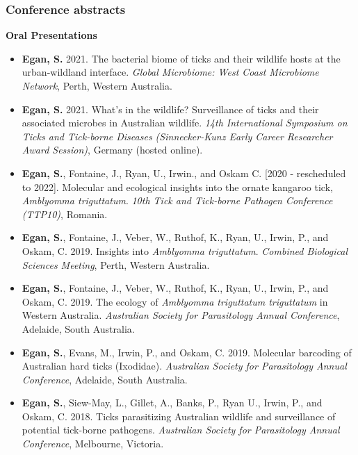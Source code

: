 \documentclass[a4paper, nobind]{templates/ociamthesis}
\providecommand{\tightlist}{%
  \setlength{\itemsep}{0pt}\setlength{\parskip}{0pt}}
\begin{document}
\hypertarget{conference-abstracts}{%
\subsubsection*{Conference abstracts}\label{conference-abstracts}}

\textbf{Oral Presentations}

\begin{itemize}
\tightlist
\item
  \textbf{Egan, S.} 2021. The bacterial biome of ticks and their wildlife hosts at the urban-wildland interface. \emph{Global Microbiome: West Coast Microbiome Network}, Perth, Western Australia.
\item
  \textbf{Egan, S.} 2021. What's in the wildlife? Surveillance of ticks and their associated microbes in Australian wildlife. \emph{14th International Symposium on Ticks and Tick-borne Diseases (Sinnecker-Kunz Early Career Researcher Award Session)}, Germany (hosted online).
\item
  \textbf{Egan, S.}, Fontaine, J., Ryan, U., Irwin., and Oskam C. {[}2020 - rescheduled to 2022{]}. Molecular and ecological insights into the ornate kangaroo tick, \emph{Amblyomma triguttatum}. \emph{10th Tick and Tick-borne Pathogen Conference (TTP10)}, Romania.
\item
  \textbf{Egan, S.}, Fontaine, J., Veber, W., Ruthof, K., Ryan, U., Irwin, P., and Oskam, C. 2019. Insights into \emph{Amblyomma triguttatum}. \emph{Combined Biological Sciences Meeting}, Perth, Western Australia.
\item
  \textbf{Egan, S.}, Fontaine, J., Veber, W., Ruthof, K., Ryan, U., Irwin, P., and Oskam, C. 2019. The ecology of \emph{Amblyomma triguttatum triguttatum} in Western Australia. \emph{Australian Society for Parasitology Annual Conference}, Adelaide, South Australia.
\item
  \textbf{Egan, S.}, Evans, M., Irwin, P., and Oskam, C. 2019. Molecular barcoding of Australian hard ticks (Ixodidae). \emph{Australian Society for Parasitology Annual Conference}, Adelaide, South Australia.
\item
  \textbf{Egan, S.}, Siew-May, L., Gillet, A., Banks, P., Ryan U., Irwin, P., and Oskam, C. 2018. Ticks parasitizing Australian wildlife and surveillance of potential tick-borne pathogens. \emph{Australian Society for Parasitology Annual Conference}, Melbourne, Victoria.
\end{itemize}
\end{document}

